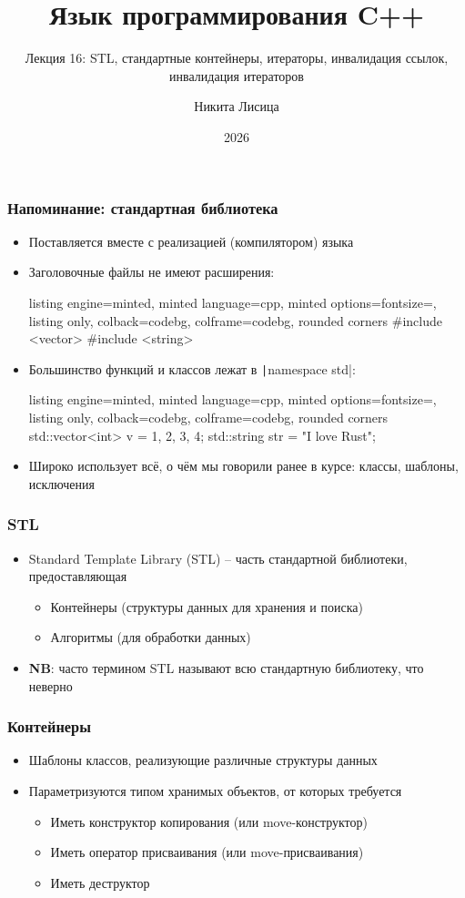 \documentclass[10pt]{beamer}
\title{Язык программирования C++}
\subtitle{Лекция 16: STL, стандартные контейнеры, итераторы, инвалидация ссылок, инвалидация итераторов}
\date{2026}
\author{Никита Лисица}
\begin{document}
\frame{\titlepage}

\begin{frame}[fragile]
\frametitle{Напоминание: стандартная библиотека}
\begin{itemize}
\item Поставляется вместе с реализацией (компилятором) языка
\pause
\item Заголовочные файлы не имеют расширения:
\begin{tcblisting}{listing engine=minted, minted language=cpp, minted options={fontsize=\scriptsize}, listing only, colback=codebg, colframe=codebg, rounded corners}
#include <vector>
#include <string>
\end{tcblisting}
\pause
{}
\item Большинство функций и классов лежат в \texttt|namespace std|:
\begin{tcblisting}{listing engine=minted, minted language=cpp, minted options={fontsize=\scriptsize}, listing only, colback=codebg, colframe=codebg, rounded corners}
std::vector<int> v = {1, 2, 3, 4};
std::string str = "I love Rust";
\end{tcblisting}
\pause
\item Широко использует всё, о чём мы говорили ранее в курсе: классы, шаблоны, исключения
\end{itemize}
\end{frame}

\begin{frame}[fragile]
\frametitle{STL}
\begin{itemize}
\item Standard Template Library (STL) -- часть стандартной библиотеки, предоставляющая
\pause
\begin{itemize}
\item Контейнеры (структуры данных для хранения и поиска)
\pause
\item Алгоритмы (для обработки данных)
\end{itemize}
\pause
\item \textbf{NB}: часто термином STL называют всю стандартную библиотеку, что неверно
\end{itemize}
\end{frame}

\begin{frame}[fragile]
\frametitle{Контейнеры}
\begin{itemize}
\item Шаблоны классов, реализующие различные структуры данных
\pause
\item Параметризуются типом хранимых объектов, от которых требуется
\begin{itemize}
\item Иметь конструктор копирования (или move-конструктор)
\item Иметь оператор присваивания (или move-присваивания)
\item Иметь деструктор
\end{itemize}
\end{itemize}
\end{frame}
\end{document}
